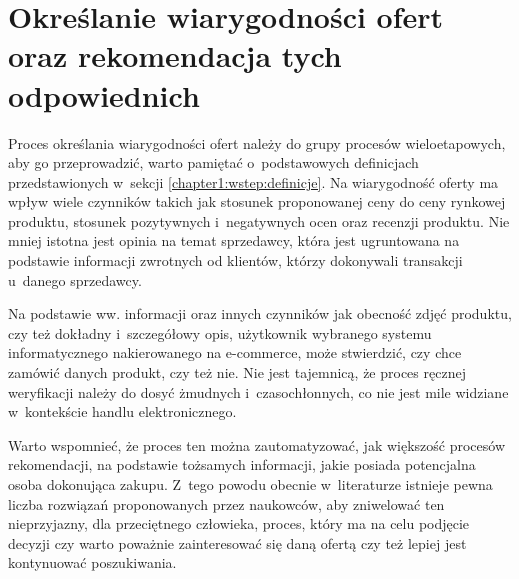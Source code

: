 \documentclass[../Kamil_Kowalewski_Main.tex]{subfiles}
\begin{document}
{    \section{Określanie wiarygodności ofert oraz rekomendacja tych odpowiednich}
    \label{chapter2:przeglad_literatury:wiarygodnosc_ofert} {
        Proces określania wiarygodności ofert należy do grupy procesów wieloetapowych,
        aby go przeprowadzić, warto pamiętać o~podstawowych definicjach przedstawionych
        w~sekcji \ref{chapter1:wstep:definicje}. Na wiarygodność oferty ma wpływ wiele
        czynników takich jak stosunek proponowanej ceny do ceny rynkowej produktu,
        stosunek pozytywnych i~negatywnych ocen oraz recenzji produktu. Nie mniej
        istotna jest opinia na temat sprzedawcy, która jest ugruntowana na podstawie
        informacji zwrotnych od klientów, którzy dokonywali transakcji u~danego
        sprzedawcy.

        Na podstawie ww. informacji oraz innych czynników jak obecność zdjęć produktu,
        czy też dokładny i~szczegółowy opis, użytkownik wybranego systemu
        informatycznego nakierowanego na e-commerce, może stwierdzić, czy chce zamówić
        danych produkt, czy też nie. Nie jest tajemnicą, że proces ręcznej weryfikacji
        należy do dosyć żmudnych i~czasochłonnych, co nie jest mile widziane
        w~kontekście handlu elektronicznego.

        Warto wspomnieć, że proces ten można zautomatyzować, jak większość procesów
        rekomendacji, na podstawie tożsamych informacji, jakie posiada potencjalna
        osoba dokonująca zakupu. Z~tego powodu obecnie w~literaturze istnieje pewna
        liczba rozwiązań proponowanych przez naukowców, aby zniwelować ten
        nieprzyjazny, dla przeciętnego człowieka, proces, który ma na celu podjęcie
        decyzji czy warto poważnie zainteresować się daną ofertą czy też lepiej jest
        kontynuować poszukiwania.
    }

}
\end{document}
